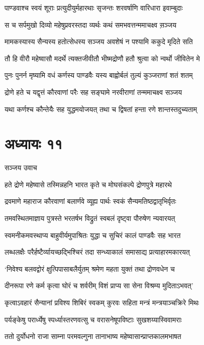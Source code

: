 \twolineshloka
{पाण्डवाश्च स्वयं शूराः प्रत्युदीयुर्महारथाः}
{सृजन्तः शरवर्षाणि वारिधारा इवाम्बुदाः}


\twolineshloka
{स च सर्पमुखो दिव्यो महेषुप्रवरस्तदा}
{व्यर्थः कथं समभवत्तन्ममाचक्ष्व स़ञ्जय}


\twolineshloka
{मामकस्यास्य सैन्यस्य हतोत्सेधस्य सञ्जय}
{अवशेषं न पश्यामि ककुदे मृदिते सति}


\twolineshloka
{तौ हि वीरौ महेष्वासौ मदर्थे त्यक्तजीवीतौ}
{भीष्मद्रोणौ हतौ श्रुत्वा को न्वर्थो जीवितेन मे}


\twolineshloka
{पुनः पुनर्न मृष्यामि वधं कर्णस्य पाण्डवैः}
{यस्य बाह्वोर्बलं तुल्यं कुञ्जराणां शतं शतम्}


\twolineshloka
{द्रोणे हते च यद्वृत्तं कौरवाणां परैः सह}
{सङ्घामे नरवीराणां तन्ममाचक्ष्व सञ्जय}


\twolineshloka
{यथा कर्णश्च कौन्तेयैः सह युद्धमयोजयत्}
{तथा च द्विषतां हन्ता रणे शान्तस्तदुच्यताम्}


\chapter{अध्यायः ११}
\twolineshloka
{सञ्जय उवाच}
{}


\twolineshloka
{हते द्रोणे महेष्वासे तस्मिन्नहनि भारत}
{कृते च मोघसंकल्पे द्रोणपुत्रे महारथे}


\twolineshloka
{द्रवमाणे महाराज कौरवाणां बलार्णवे}
{व्यूह्य पार्थः स्वकं सैन्यमतिष्ठद्वातृभिर्वृतः}


\twolineshloka
{तमवस्थितमाज्ञाय पुत्रस्ते भरतर्षभ}
{विद्रुतं स्वबलं दृष्ट्वा पौरुषेण न्यवारयत्}


\twolineshloka
{स्वमनीकमवस्थाप्य बाहुवीर्यमुपाश्रितः}
{युद्धा च सुचिरं कालं पाण्डवैः सह भारत}


\twolineshloka
{लब्धलक्षैः परैर्हष्टैर्व्यायच्छद्भिश्चिरं तदा}
{सन्ध्याकालं समासाद्य प्रत्याहारमकारयत्}


\twolineshloka
{`निवेश्य बलवद्वोरं क्षुत्पिपासाबलैर्युतम्}
{श्रमेण महता युक्तं तथा द्रोणवधेन च}


\twolineshloka
{दीनरूपा रणे कर्म कृत्वा घोरं च शर्वरीम्}
{विशं प्राप्य सा सेना विश्रम्य मुदिताऽभवत्'}


\twolineshloka
{कृत्वाऽवहारं सैन्यानां प्रविश्य शिबिरं स्वकम्}
{कुरवः सहिता मन्त्रं मन्त्रयाञ्चक्रिरे मिथः}


\twolineshloka
{पर्यङ्केषु परार्ध्येषु स्पर्ध्यास्तरणवत्सु च}
{वरासनेषूपविष्टाः सुखशय्यास्विवामराः}


\twolineshloka
{ततो दुर्योधनो राजा साम्ना परमवल्गुना}
{तानाभाष्य महेष्वासान्प्राप्तकालमभाषत}


